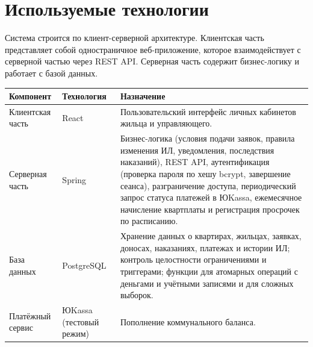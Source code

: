 \documentclass[12pt,a4paper]{article}
\begin{document}
\section{Используемые технологии}

Система строится по клиент-серверной архитектуре. Клиентская часть
представляет собой одностраничное веб-приложение, которое взаимодействует
с серверной частью через REST API. Серверная часть содержит бизнес-логику
и работает с базой данных.

\begin{longtable}{L{30mm} L{38mm} L{85mm}}
\toprule
\textbf{Компонент} & \textbf{Технология} & \textbf{Назначение} \\
\midrule
\endhead
\bottomrule
\endfoot
Клиентская часть & React & Пользовательский интерфейс личных кабинетов жильца и управляющего. \\
Серверная часть & Spring & Бизнес-логика (условия подачи заявок, правила изменения ИЛ, уведомления, последствия наказаний), REST API, аутентификация (проверка пароля по хешу bcrypt, завершение сеанса), разграничение доступа, периодический запрос статуса платежей в ЮKassa, ежемесячное начисление квартплаты и регистрация просрочек по расписанию. \\
База данных & PostgreSQL & Хранение данных о квартирах, жильцах, заявках, доносах, наказаниях, платежах и истории ИЛ; контроль целостности ограничениями и триггерами; функции для атомарных операций с деньгами и учётными записями и для сложных выборок. \\
Платёжный сервис & ЮKassa (тестовый режим) & Пополнение коммунального баланса. \\
\end{longtable}
\end{document}
